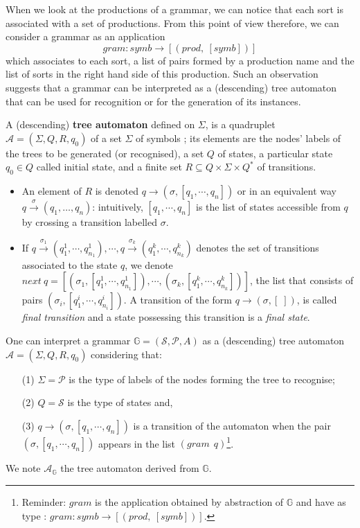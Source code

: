 When we look at the productions of a grammar, we can notice that each sort is associated with a set of productions. From this point of view therefore, we can consider a grammar as an application
\[
	 gram : symb \rightarrow [(prod,~[symb])]
\]
which associates to each sort, a list of pairs formed by a production name and the list of sorts in the right hand side of this production. Such an observation suggests that a grammar can be interpreted as a (descending) tree automaton that can be used for recognition or for the generation of its instances.

\begin{definition}
\label{chap2:def:tree-automaton}
A (descending) \textbf{tree automaton} defined on $\Sigma$, is a quadruplet $\mathcal{A}=(\Sigma,Q,R,q_0)$ of a 
 set $\Sigma$ of symbols %
; its elements are the nodes' labels of the trees to be generated (or recognised), a set $Q$ of states, a particular state $q_0 \in Q$ called initial state, and a finite set $R\subseteq  Q \times \Sigma \times Q^*$ of transitions.
\begin{itemize}
	\item An element of $R$ is denoted $q\rightarrow \left( \sigma, [ q_1,\cdots,q_n]\right)$ or in an equivalent way  $q\stackrel{\sigma}{\rightarrow}(q_{1},\ldots,q_{n})$: intuitively, $[ q_1,\cdots,q_n]$ is the list of states accessible from $q$ by crossing a transition labelled $\sigma$.
	\item If $q\stackrel{\sigma_1}{\rightarrow}\left( q_{1}^1, \cdots, q_{n_1}^1\right), \cdots, q\stackrel{\sigma_k}{\rightarrow}\left( q_{1}^k, \cdots, q_{n_k}^k\right)$ denotes the set of transitions associated to the state $q$, we denote \textbf{$next~q=[\left( \sigma_1,[ q_{1}^1, \cdots, q_{n_1}^1]\right),\cdots, \left( \sigma_k,[ q_{1}^k, \cdots, q_{n_k}^k]\right)]$}, the list that consists of pairs $\left( \sigma_i,[ q_{1}^i, \cdots, q_{n_i}^i]\right)$. 
	A transition of the form $q\rightarrow(\sigma,[\;])$, is called \textit{final transition} and a state possessing this transition is a \textit{final state}.
\end{itemize}
\end{definition}


One can interpret a grammar $\mathbb{G}=\left(\mathcal{S},\mathcal{P},A\right)$ as a (descending) tree automaton \cite{Comon} $\mathcal{A}=(\Sigma,Q,R,q_0)$ considering that:
\begin{itemize}
	\item[(1)] $\Sigma=\mathcal{P}$ is the type of labels of the nodes forming the tree to recognise; 
	\item[(2)] $Q=\mathcal{S}$ is the type of states and, 
	\item[(3)] $q\rightarrow \left( \sigma,[ q_1,\cdots,q_n]\right)$ is a transition of the automaton when the pair $\left(\sigma,[q_1,\cdots,q_n] \right)$ appears in the list $(gram~~ q)$\footnote{Reminder: $gram$ is the application obtained by abstraction of $\mathbb{G}$ and have as type : $gram : symb \rightarrow [(prod,~[symb])]$.}.
\end{itemize}
We note $\mathcal{A}_{\mathbb{G}} $ the tree automaton derived from $\mathbb{G}$.


